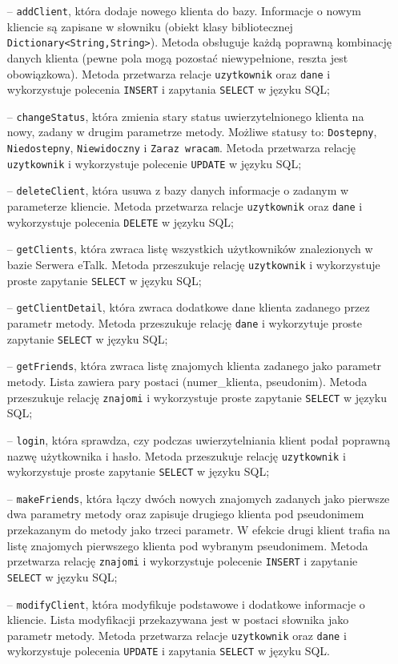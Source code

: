 \documentclass[a4paper,12pt]{article}
\begin{document}
\begin{itemize}
    \item[--] \texttt{addClient}, która dodaje nowego klienta do bazy. Informacje o nowym kliencie są zapisane w słowniku (obiekt klasy bibliotecznej \texttt{Dictionary<String,String>}). Metoda obsługuje każdą poprawną kombinację danych klienta (pewne pola mogą pozostać niewypełnione, reszta jest obowiązkowa).
              Metoda przetwarza relacje \texttt{uzytkownik} oraz \texttt{dane} i wykorzystuje polecenia \texttt{INSERT} i zapytania \texttt{SELECT} w języku SQL;
    \item[--] \texttt{changeStatus}, która zmienia stary status uwierzytelnionego klienta na nowy, zadany w drugim parametrze metody. Możliwe statusy to: \texttt{Dostepny}, \texttt{Niedostepny}, \texttt{Niewidoczny} i \texttt{Zaraz wracam}. Metoda przetwarza relację \texttt{uzytkownik} i wykorzystuje polecenie \texttt{UPDATE} w języku SQL;
    \item[--] \texttt{deleteClient}, która usuwa z bazy danych informacje o zadanym w parameterze kliencie.
              Metoda przetwarza relacje \texttt{uzytkownik} oraz \texttt{dane} i wykorzystuje polecenia \texttt{DELETE} w języku SQL;
    \item[--] \texttt{getClients}, która zwraca listę wszystkich użytkowników znalezionych w bazie Serwera eTalk.
              Metoda przeszukuje relację \texttt{uzytkownik} i wykorzystuje proste zapytanie \texttt{SELECT} w języku SQL;
    \item[--] \texttt{getClientDetail}, która zwraca dodatkowe dane klienta zadanego przez parametr metody.
              Metoda przeszukuje relację \texttt{dane} i wykorzytuje proste zapytanie \texttt{SELECT} w języku SQL;
    \item[--] \texttt{getFriends}, która zwraca listę znajomych klienta zadanego jako parametr metody. Lista zawiera pary postaci (numer\_klienta, pseudonim).
        Metoda przeszukuje relację \texttt{znajomi} i wykorzystuje proste zapytanie \texttt{SELECT} w języku SQL;
    \item[--] \texttt{login}, która sprawdza, czy podczas uwierzytelniania klient podał poprawną nazwę użytkownika i hasło. Metoda przeszukuje relację \texttt{uzytkownik} i wykorzystuje proste zapytanie \texttt{SELECT} w języku SQL;
    \item[--] \texttt{makeFriends}, która łączy dwóch nowych znajomych zadanych jako pierwsze dwa parametry metody oraz zapisuje drugiego klienta pod pseudonimem przekazanym do metody jako trzeci parametr. W efekcie drugi klient trafia na listę znajomych pierwszego klienta pod wybranym pseudonimem.  
        Metoda przetwarza relację \texttt{znajomi} i wykorzystuje polecenie \texttt{INSERT} i zapytanie \texttt{SELECT} w języku SQL;
    \item[--] \texttt{modifyClient}, która modyfikuje podstawowe i dodatkowe informacje o kliencie. Lista modyfikacji przekazywana jest w postaci słownika jako parametr metody.   
        Metoda przetwarza relacje \texttt{uzytkownik} oraz \texttt{dane} i wykorzystuje polecenia \texttt{UPDATE} i zapytania \texttt{SELECT} w języku SQL.
\end{itemize}
\end{document}
